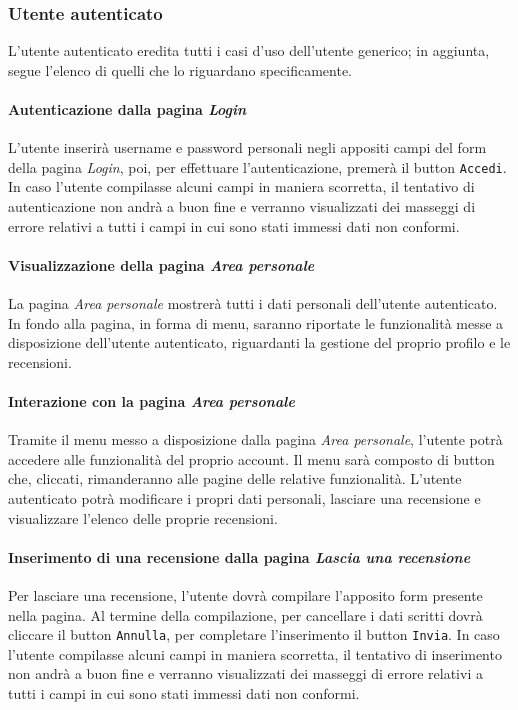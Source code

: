 \subsubsection{Utente autenticato}
\label{analisi-casi-uso-attori-principali-utente-autenticato}
L'utente autenticato eredita tutti i casi d'uso dell'utente generico; in aggiunta, segue l'elenco  di quelli che lo riguardano specificamente.


\paragraph{Autenticazione dalla pagina \textit{Login}}
\label{analisi-casi-uso-attori-principali-utente-autenticato-1}
L'utente inserirà username e password personali negli appositi campi del form della pagina \textit{Login}, poi, per effettuare l'autenticazione, premerà il button \texttt{Accedi}. In caso l'utente compilasse alcuni campi in maniera scorretta, il tentativo di autenticazione non andrà a buon fine e verranno visualizzati dei masseggi di errore relativi a tutti i campi in cui sono stati immessi dati non conformi.


\paragraph{Visualizzazione della pagina \textit{Area personale}}
\label{analisi-casi-uso-attori-principali-utente-autenticato-2}
La pagina \textit{Area personale} mostrerà tutti i dati personali dell'utente autenticato. In fondo alla pagina, in forma di menu, saranno riportate le funzionalità messe a disposizione dell'utente autenticato, riguardanti la gestione del proprio profilo e le recensioni.


\paragraph{Interazione con la pagina \textit{Area personale}}
\label{analisi-casi-uso-attori-principali-utente-autenticato-3}
Tramite il menu messo a disposizione dalla pagina \textit{Area personale}, l'utente potrà accedere alle funzionalità del proprio account. Il menu sarà composto di button che, cliccati, rimanderanno alle pagine delle relative funzionalità. L'utente autenticato potrà modificare i propri dati personali, lasciare una recensione e visualizzare l'elenco delle proprie recensioni.


\paragraph{Inserimento di una recensione dalla pagina \textit{Lascia una recensione}}
\label{analisi-casi-uso-attori-principali-utente-autenticato-4}
Per lasciare una recensione, l'utente dovrà compilare l'apposito form presente nella pagina. Al termine della compilazione, per cancellare i dati scritti dovrà cliccare il button \texttt{Annulla}, per completare l'inserimento il button \texttt{Invia}. In caso l'utente compilasse alcuni campi in maniera scorretta, il tentativo di inserimento non andrà a buon fine e verranno visualizzati dei masseggi di errore relativi a tutti i campi in cui sono stati immessi dati non conformi.


